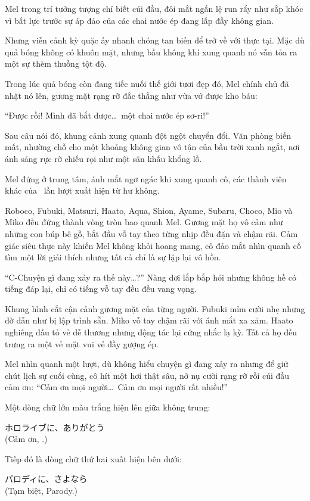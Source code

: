 \documentclass[../main.tex]{subfiles}
\begin{document}
Mel trong trí tưởng tượng chỉ biết cúi đầu, đôi mắt ngấn lệ run rẩy như sắp khóc vì bất lực trước sự áp đảo của các chai nước ép đang lấp đầy không gian.

Nhưng viễn cảnh kỳ quặc ấy nhanh chóng tan biến để trở về với thực tại. Mặc dù quả bóng không có khuôn mặt, nhưng bầu không khí xung quanh nó vẫn tỏa ra một sự thèm thuồng tột độ.

Trong lúc quả bóng còn đang tiếc nuối thế giới tươi đẹp đó, Mel chính chủ đã nhặt nó lên, gương mặt rạng rỡ đắc thắng như vừa vớ được kho báu:


``Được rồi! Mình đã bắt được\dots\ một chai nước ép sơ-ri!''

Sau câu nói đó, khung cảnh xung quanh đột ngột chuyển đổi. Văn phòng biến mất, nhường chỗ cho một khoảng không gian vô tận của bầu trời xanh ngắt, nơi ánh sáng rực rỡ chiếu rọi như một sân khấu khổng lồ.


Mel đứng ở trung tâm, ánh mắt ngơ ngác khi xung quanh cô, các thành viên khác của \hll\ lần lượt xuất hiện từ hư không.

Roboco, Fubuki, Matsuri, Haato, Aqua, Shion, Ayame, Subaru, Choco, Mio và Miko đều đứng thành vòng tròn bao quanh Mel. Gương mặt họ vô cảm như những con búp bê gỗ, bắt đầu vỗ tay theo từng nhịp đều đặn và chậm rãi. Cảm giác siêu thực này khiến Mel không khỏi hoang mang, cô đảo mắt nhìn quanh cố tìm một lời giải thích nhưng tất cả chỉ là sự lặp lại vô hồn.

``C-Chuyện gì đang xảy ra thế này\dots?'' Nàng dơi lắp bắp hỏi nhưng không hề có tiếng đáp lại, chỉ có tiếng vỗ tay đều đều vang vọng.


Khung hình cắt cận cảnh gương mặt của từng người. Fubuki mỉm cười nhẹ nhưng đờ đẫn như bị lập trình sẵn. Miko vỗ tay chậm rãi với ánh mắt xa xăm. Haato nghiêng đầu tỏ vẻ dễ thương nhưng động tác lại cứng nhắc lạ kỳ. Tất cả họ đều trưng ra một vẻ mặt vui vẻ đầy gượng ép.

Mel nhìn quanh một lượt, dù không hiểu chuyện gì đang xảy ra nhưng để giữ chút lịch sự cuối cùng, cô hít một hơi thật sâu, nở nụ cười rạng rỡ rồi cúi đầu cảm ơn: ``Cảm ơn mọi người\dots\ Cảm ơn mọi người rất nhiều!''

Một dòng chữ lớn màu trắng hiện lên giữa không trung:
\begin{center}
  ホロライブに、ありがとう\\(Cảm ơn, \hll.)
\end{center}
Tiếp đó là dòng chữ thứ hai xuất hiện bên dưới:
\begin{center}
  パロディに、さよなら\\(Tạm biệt, Parody.)
\end{center}
\end{document}
